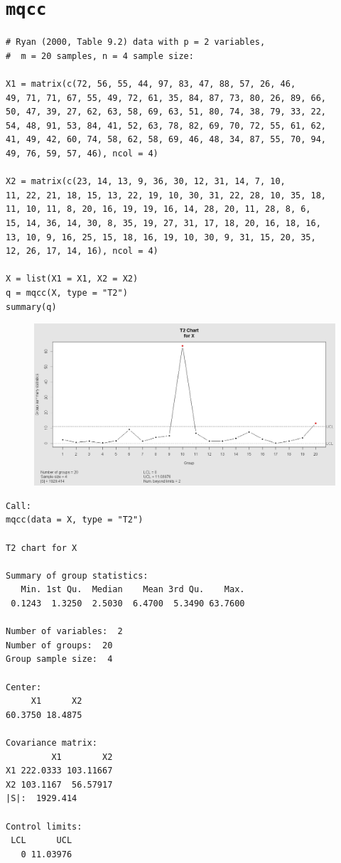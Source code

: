 \documentclass[a4paper,12pt]{article}
\begin{document}
\section{\texttt{mqcc}}
\begin{framed}
\begin{verbatim}
# Ryan (2000, Table 9.2) data with p = 2 variables, 
#  m = 20 samples, n = 4 sample size:

X1 = matrix(c(72, 56, 55, 44, 97, 83, 47, 88, 57, 26, 46,
49, 71, 71, 67, 55, 49, 72, 61, 35, 84, 87, 73, 80, 26, 89, 66,
50, 47, 39, 27, 62, 63, 58, 69, 63, 51, 80, 74, 38, 79, 33, 22,
54, 48, 91, 53, 84, 41, 52, 63, 78, 82, 69, 70, 72, 55, 61, 62,
41, 49, 42, 60, 74, 58, 62, 58, 69, 46, 48, 34, 87, 55, 70, 94,
49, 76, 59, 57, 46), ncol = 4)

X2 = matrix(c(23, 14, 13, 9, 36, 30, 12, 31, 14, 7, 10,
11, 22, 21, 18, 15, 13, 22, 19, 10, 30, 31, 22, 28, 10, 35, 18,
11, 10, 11, 8, 20, 16, 19, 19, 16, 14, 28, 20, 11, 28, 8, 6,
15, 14, 36, 14, 30, 8, 35, 19, 27, 31, 17, 18, 20, 16, 18, 16,
13, 10, 9, 16, 25, 15, 18, 16, 19, 10, 30, 9, 31, 15, 20, 35,
12, 26, 17, 14, 16), ncol = 4)

X = list(X1 = X1, X2 = X2)
q = mqcc(X, type = "T2")
summary(q)
\end{verbatim}
\end{framed}
\begin{figure}[h!]
\centering
\includegraphics[width=0.9\linewidth]{./mqccplot1}
\caption{}
\label{fig:mqccplot1}
\end{figure}
\newpage
\begin{verbatim}
Call:
mqcc(data = X, type = "T2")

T2 chart for X 

Summary of group statistics:
   Min. 1st Qu.  Median    Mean 3rd Qu.    Max. 
 0.1243  1.3250  2.5030  6.4700  5.3490 63.7600 

Number of variables:  2
Number of groups:  20
Group sample size:  4

Center: 
     X1      X2 
60.3750 18.4875 

Covariance matrix:
         X1        X2
X1 222.0333 103.11667
X2 103.1167  56.57917
|S|:  1929.414 

Control limits:
 LCL      UCL
   0 11.03976

\end{verbatim}
\newpage
\end{document}
